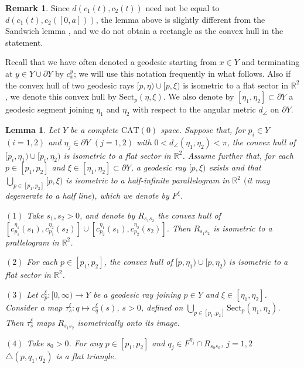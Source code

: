 \documentclass[12pt]{amsart}
\numberwithin{equation}{section}
\theoremstyle{plain}
\newtheorem{Lemma}[Theorem]{Lemma}
\theoremstyle{definition}
\newtheorem{Remark}[Theorem]{Remark}
\theoremstyle{remark}
\newcommand{\R}{{\mathbb R}}
\newcommand{\cat}[1]{\mathrm{CAT}(#1)}
\newcommand{\ray}[1]{[#1)}
\newcommand{\cc}[2]{c_{#1}^{#2}}
\newcommand{\tri}[3]{\triangle(#1,#2,#3)}
\newcommand{\trans}[2]{\tau_{#1}^{#2}}
\newcommand{\sect}[3][]{\mathrm{Sect}_{#1}(#2,#3)}
\begin{document}
\begin{Remark}
 \label{rem:different_from_sandwich_lemma}
 Since $d(c_1(t),c_2(t))$ need not be equal to $d(c_1(t), c_2([0,a]))$,
 the lemma above is slightly different from the Sandwich lemma
 \cite[p.~182, 2.12 Exercise (2)]{bridson-haefliger}, and we do not
 obtain a rectangle as the convex hull in the statement. 
\end{Remark}

%
%
Recall that we have often denoted a geodesic starting from 
$x \in Y$ and terminating at $y \in Y \cup\partial Y$ by $\cc{x}{y}$; we
will use this notation frequently in what follows.
Also if the convex hull of two geodesic rays 
$\ray{p,\eta}\cup \ray{p,\xi}$ is isometric to a flat sector in $\R^2$, 
we denote this convex hull by $\sect[p]{\eta}{\xi}$. 
We also denote by $[\eta_1,\eta_2] \subset \partial Y$ a geodesic
segment joining $\eta_1$ and $\eta_2$ with respect to the angular metric
$d_{\angle}$ on $\partial Y$. 

\begin{Lemma}
\label{lem:parallelogram_and_sliding}
 Let $Y$ be a complete $\cat{0}$ space. 
 Suppose that, for $p_i \in Y$ $(i=1,2)$ and 
 $\eta_j \in \partial Y$ $(j=1,2)$ with 
 $0<d_{\angle}(\eta_1,\eta_2)<\pi$,
 the convex hull of 
 $\ray{p_i,\eta_1}\cup \ray{p_i,\eta_2}$ is isometric to a flat sector
 in $\R^2$. 
 Assume further that,  for each $p \in [p_1,p_2]$ and
 $\xi \in [\eta_1,\eta_2]\subset \partial Y$, a geodesic ray $[p,\xi)$
 exists and that $\bigcup_{p \in [p_1,p_2]} [p,\xi)$ is isometric to a
 half-infinite parallelogram in $\R^2$ 
 $($it may degenerate to a half line$)$, 
 which we denote by $F^{\xi}$. 

 $(1)$ Take $s_1, s_2 >0$, and denote by $R_{s_1s_2}$ the convex hull of 
 $[\cc{p_1}{\eta_1}(s_1), \cc{p_1}{\eta_2}(s_2)] \cup
  [\cc{p_2}{\eta_1}(s_1), \cc{p_2}{\eta_2}(s_2)]$. 
 Then $R_{s_1s_2}$ is isometric to a prallelogram in $\R^2$. 

 $(2)$ For each $p \in [p_1,p_2]$, the convex hull of 
 $\ray{p,\eta_1}\cup\ray{p,\eta_2}$ is isometric to 
 a flat sector in $\R^2$.  

 $(3)$ 
 Let $\cc{p}{\xi}\colon \ray{0,\infty}\rightarrow Y$ be a
 geodesic ray joining $p\in Y$ and $\xi \in [\eta_1,\eta_2]$. 
 Consider a map 
 $\trans{s}{\xi} \colon q \mapsto \cc{q}{\xi}(s)$, $s>0$, 
 defined on 
 $\bigcup_{p \in [p_1,p_2]} \sect[p]{\eta_1}{\eta_2}$. 
 Then $\trans{s}{\xi}$ maps $R_{s_1s_2}$ isometrically onto its image. 

 $(4)$ Take $s_0>0$. 
 For any $p \in [p_1,p_2]$ and 
 $q_j \in F^{\eta_j} \cap R_{s_0s_0}$, $j=1,2$ 
 $\tri{p}{q_1}{q_2}$ is a flat triangle. 
\end{Lemma}
\end{document}
